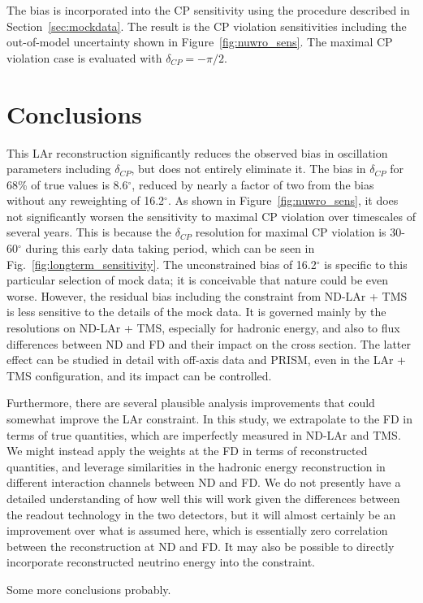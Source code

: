 \documentclass[11pt]{article}
\begin{document}
The bias is incorporated into the CP sensitivity using the procedure described in Section~\ref{sec:mockdata}. The result is the CP violation sensitivities including the out-of-model uncertainty shown in Figure~\ref{fig:nuwro_sens}. The maximal CP violation case is evaluated with $\delta_{CP} = -\pi/2$.

\section{Conclusions}
\label{sec:conclusions}

This LAr reconstruction significantly reduces the observed bias in oscillation parameters including $\delta_{CP}$, but does not entirely eliminate it. The bias in $\delta_{CP}$ for 68\% of true values is 8.6$^{\circ}$, reduced by nearly a factor of two from the bias without any reweighting of 16.2$^{\circ}$. As shown in Figure~\ref{fig:nuwro_sens}, it does not significantly worsen the sensitivity to maximal CP violation over timescales of several years. This is because the $\delta_{CP}$ resolution for maximal CP violation is 30-60$^{\circ}$ during this early data taking period, which can be seen in Fig.~\ref{fig:longterm_sensitivity}. The unconstrained bias of 16.2$^{\circ}$ is specific to this particular selection of mock data; it is conceivable that nature could be even worse. However, the residual bias including the constraint from ND-LAr + TMS is less sensitive to the details of the mock data. It is governed mainly by the resolutions on ND-LAr + TMS, especially for hadronic energy, and also to flux differences between ND and FD and their impact on the cross section. The latter effect can be studied in detail with off-axis data and PRISM, even in the LAr + TMS configuration, and its impact can be controlled.

Furthermore, there are several plausible analysis improvements that could somewhat improve the LAr constraint. In this study, we extrapolate to the FD in terms of true quantities, which are imperfectly measured in ND-LAr and TMS. We might instead apply the weights at the FD in terms of reconstructed quantities, and leverage similarities in the hadronic energy reconstruction in different interaction channels between ND and FD. We do not presently have a detailed understanding of how well this will work given the differences between the readout technology in the two detectors, but it will almost certainly be an improvement over what is assumed here, which is essentially zero correlation between the reconstruction at ND and FD. It may also be possible to directly incorporate reconstructed neutrino energy into the constraint.

Some more conclusions probably.
\end{document}
